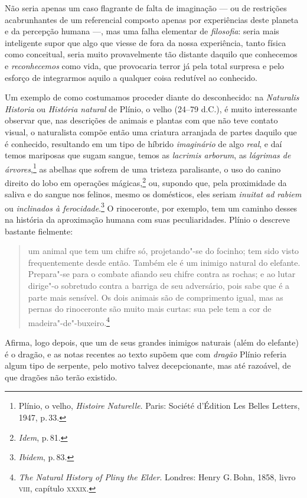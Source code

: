 Não seria apenas um caso flagrante de falta de imaginação --- ou de
restrições acabrunhantes de um referencial composto apenas por
experiências deste planeta e da percepção humana ---, mas uma falha
elementar de \textit{filosofia}: seria mais inteligente supor que algo que
viesse de fora da nossa experiência, tanto física como conceitual, seria
muito provavelmente tão distante daquilo que conhecemos e
\textit{reconhecemos} como vida, que provocaria terror já pela total
surpresa e pelo esforço de integrarmos aquilo a qualquer coisa redutível
ao conhecido.

Um exemplo de como costumamos proceder diante do desconhecido: na
\textit{Naturalis Historia} ou \textit{História natural} de Plínio, o velho (24--79
d.C.), é muito interessante observar que, nas descrições de animais e
plantas com que não teve contato visual, o naturalista compõe então uma
criatura arranjada de partes daquilo que é conhecido, resultando em um
tipo de híbrido \textit{imaginário} de algo \textit{real}, e daí temos
mariposas que sugam sangue, temos as \textit{lacrimis arborum}, as \textit{lágrimas
de árvores},\footnote{Plínio, o velho, \textit{Histoire Naturelle}. Paris: Société d'Édition Les Belles Letters, 1947, p.\,33.} as abelhas que
sofrem de uma tristeza paralisante, o uso do canino direito do lobo em
operações mágicas,\footnote{\textit{Idem}, p.\,81.} ou, supondo que, pela
proximidade da saliva e do sangue nos felinos, mesmo os domésticos, eles
seriam \textit{inuitat ad rabiem} ou \textit{inclinados à
ferocidade}.\footnote{\textit{Ibidem}, p.\,83.} O rinoceronte, por
exemplo, tem um caminho desses na história da aproximação humana com
suas peculiaridades. Plínio o descreve bastante fielmente:

\begin{quote}
um animal que tem um chifre só, projetando"-se do focinho; tem sido visto
frequentemente desde então. Também ele é um inimigo natural do elefante.
Prepara"-se para o combate afiando seu chifre contra as rochas; e ao
lutar dirige"-o sobretudo contra a barriga de seu adversário, pois sabe
que é a parte mais sensível. Os dois animais são de comprimento igual,
mas as pernas do rinoceronte são muito mais curtas: sua pele tem a cor
de madeira"-de"-buxeiro.\footnote{\textit{The Natural History of Pliny the
  Elder}. Londres: Henry G.\,Bohn, 1858, livro \textsc{viii}, capítulo \textsc{xxxix}.}
\end{quote}

Afirma, logo depois, que um de seus grandes inimigos naturais (além do
elefante) é o dragão, e as notas recentes ao texto supõem que com
\textit{dragão} Plínio referia algum tipo de serpente, pelo motivo talvez
decepcionante, mas até razoável, de que dragões não terão existido.

